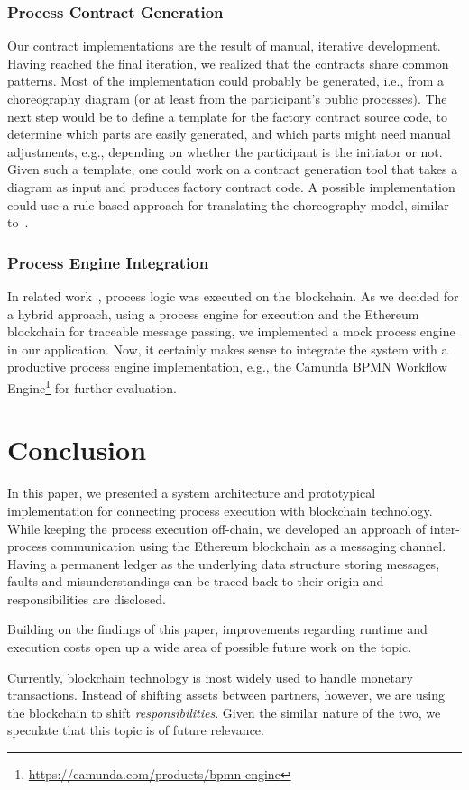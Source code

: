 \documentclass[runningheads]{llncs}
\begin{document}
\subsubsection{Process Contract Generation}

Our contract implementations are the result of manual, iterative development.
Having reached the final iteration, we realized that the contracts share common patterns.
Most of the implementation could probably be generated, i.e., from a choreography diagram (or at least from the participant's public processes).
The next step would be to define a template for the factory contract source code, to determine which parts are easily generated, and which parts might need manual adjustments, e.g., depending on whether the participant is the initiator or not.
Given such a template, one could work on a contract generation tool that takes a diagram as input and produces factory contract code.
A possible implementation could use a rule-based approach for translating the choreography model, similar to~\cite{lopez2017caterpillar}.

\subsubsection{Process Engine Integration}

In related work~\cite{lopez2017caterpillar}, process logic was executed on the blockchain.
As we decided for a hybrid approach, using a process engine for execution and the Ethereum blockchain for traceable message passing, we implemented a mock process engine in our application.
Now, it certainly makes sense to integrate the system with a productive process engine implementation, e.g., the Camunda BPMN Workflow Engine\footnote{\url{https://camunda.com/products/bpmn-engine}} for further evaluation.

\section{Conclusion} \label{conclusion}

In this paper, we presented a system architecture and prototypical implementation for connecting process execution with blockchain technology.
While keeping the process execution off-chain, we developed an approach of inter-process communication using the Ethereum blockchain as a messaging channel.
Having a permanent ledger as the underlying data structure storing messages, faults and misunderstandings can be traced back to their origin and responsibilities are disclosed.

Building on the findings of this paper, improvements regarding runtime and execution costs open up a wide area of possible future work on the topic.

Currently, blockchain technology is most widely used to handle monetary transactions.
Instead of shifting assets between partners, however, we are using the blockchain to shift \emph{responsibilities}.
Given the similar nature of the two, we speculate that this topic is of future relevance.
%
%
%


\end{document}
